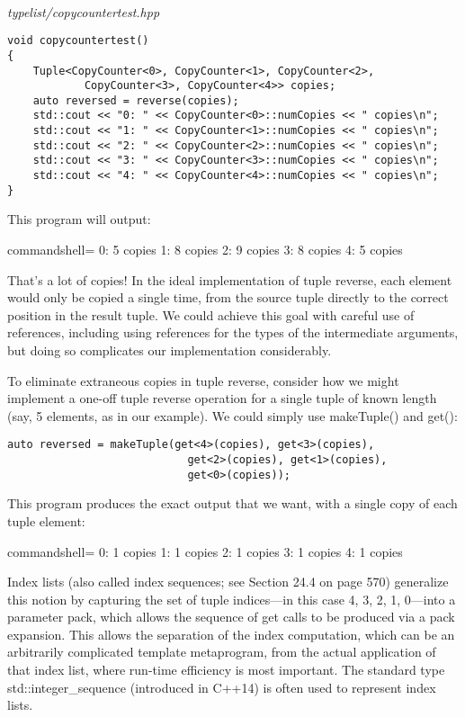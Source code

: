 \hspace*{\fill} \\ %
\noindent
\textit{typelist/copycountertest.hpp}
\begin{lstlisting}[style=styleCXX]
void copycountertest()
{
	Tuple<CopyCounter<0>, CopyCounter<1>, CopyCounter<2>,
			CopyCounter<3>, CopyCounter<4>> copies;
	auto reversed = reverse(copies);
	std::cout << "0: " << CopyCounter<0>::numCopies << " copies\n";
	std::cout << "1: " << CopyCounter<1>::numCopies << " copies\n";
	std::cout << "2: " << CopyCounter<2>::numCopies << " copies\n";
	std::cout << "3: " << CopyCounter<3>::numCopies << " copies\n";
	std::cout << "4: " << CopyCounter<4>::numCopies << " copies\n";
}
\end{lstlisting}

This program will output:

\begin{tcblisting}{commandshell={}}
0: 5 copies
1: 8 copies
2: 9 copies
3: 8 copies
4: 5 copies
\end{tcblisting}

That’s a lot of copies! In the ideal implementation of tuple reverse, each element would only be copied a single time, from the source tuple directly to the correct position in the result tuple. We could achieve this goal with careful use of references, including using references for the types of the intermediate arguments, but doing so complicates our implementation considerably.

To eliminate extraneous copies in tuple reverse, consider how we might implement a one-off tuple reverse operation for a single tuple of known length (say, 5 elements, as in our example). We could simply use makeTuple() and get():

\begin{lstlisting}[style=styleCXX]
auto reversed = makeTuple(get<4>(copies), get<3>(copies),
							get<2>(copies), get<1>(copies),
							get<0>(copies));
\end{lstlisting}

This program produces the exact output that we want, with a single copy of each tuple element:

\begin{tcblisting}{commandshell={}}
0: 1 copies
1: 1 copies
2: 1 copies
3: 1 copies
4: 1 copies
\end{tcblisting}

Index lists (also called index sequences; see Section 24.4 on page 570) generalize this notion by capturing the set of tuple indices—in this case 4, 3, 2, 1, 0—into a parameter pack, which allows the sequence of get calls to be produced via a pack expansion. This allows the separation of the index computation, which can be an arbitrarily complicated template metaprogram, from the actual application of that index list, where run-time efficiency is most important. The standard type std::integer\_sequence (introduced in C++14) is often used to represent index lists.

